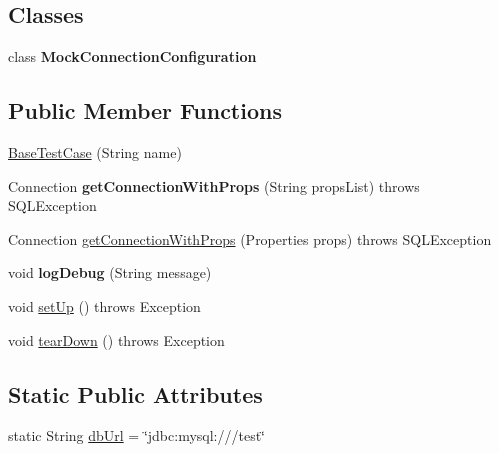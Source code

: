 \subsection*{Classes}
\begin{DoxyCompactItemize}
\item 
class {\bfseries Mock\+Connection\+Configuration}
\end{DoxyCompactItemize}
\subsection*{Public Member Functions}
\begin{DoxyCompactItemize}
\item 
\mbox{\hyperlink{classtestsuite_1_1_base_test_case_a353e63229f72905eb043169b6c2002b5}{Base\+Test\+Case}} (String name)
\item 
\mbox{\label{classtestsuite_1_1_base_test_case_a7a043249373f91474cb8dbfad42ea105}} 
Connection {\bfseries get\+Connection\+With\+Props} (String props\+List)  throws S\+Q\+L\+Exception 
\item 
Connection \mbox{\hyperlink{classtestsuite_1_1_base_test_case_a694c26abcb73b73849f9d10ffdc4ebae}{get\+Connection\+With\+Props}} (Properties props)  throws S\+Q\+L\+Exception 
\item 
\mbox{\label{classtestsuite_1_1_base_test_case_ad4d75cf77ae765c312cda0d97c610a21}} 
void {\bfseries log\+Debug} (String message)
\item 
void \mbox{\hyperlink{classtestsuite_1_1_base_test_case_a195f5d285c7979328734606d08ad15b1}{set\+Up}} ()  throws Exception 
\item 
void \mbox{\hyperlink{classtestsuite_1_1_base_test_case_a51c7d76ab24b0c966f956250fd7a4f52}{tear\+Down}} ()  throws Exception 
\end{DoxyCompactItemize}
\subsection*{Static Public Attributes}
\begin{DoxyCompactItemize}
\item 
static String \mbox{\hyperlink{classtestsuite_1_1_base_test_case_abf615dd75e2b0bff6538d49bcc34541c}{db\+Url}} = \char`\"{}jdbc\+:mysql\+:///test\char`\"{}
\end{DoxyCompactItemize}
